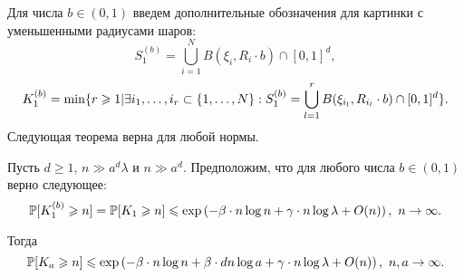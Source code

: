 
 Для числа $b \in (0, 1)$ введем дополнительные обозначения для картинки с уменьшенными радиусами шаров: 
\begin{equation*}
    S_1^{(b)} = \bigcup_{i=1}^N B(\xi_i, R_i\cdot b) \cap [0,1]^d,
\end{equation*}
\begin{equation*}
    K_1^{(b)} = \min \{r \geqslant 1 | \exists i_1, \ldots , i_r \subset \{1, \ldots , N\} : S_1^{(b)} = \bigcup\limits_{l=1}^r B(\xi_{i_l}, R_{i_l}\cdot b) \cap [0,1]^d\}.
\end{equation*}
Следующая теорема верна для любой нормы.

\begin{thm}\label{uppgen}
Пусть $d\geq 1$,  $n \gg a^d\lambda$ и $n \gg a^d$. 
Предположим, что для любого числа $b \in (0, 1)$ верно следующее:
$$\mathbb{P}[K_1^{(b)} \geqslant n] =\mathbb{P}[K_1 \geqslant n] \leqslant \exp \left(-\beta\cdot n\log n + \gamma\cdot n\log\lambda + O(n)\right),\  n \to \infty.$$
    


Тогда 
\begin{equation*}
    \mathbb{P}[K_a \geqslant n] \leqslant \exp \left(-\beta\cdot n\log n + \beta\cdot dn\log a + \gamma\cdot n\log\lambda + O(n)\right),\  n, a \to \infty.
\end{equation*}{}
\end{thm}

